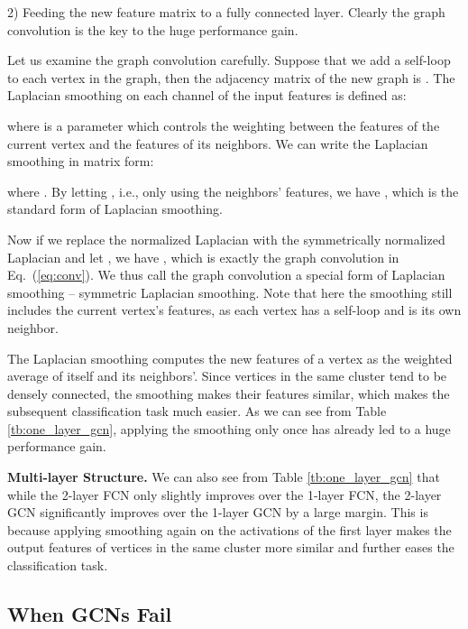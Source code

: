 \documentclass[letterpaper]{article} \usepackage{aaai18}  \usepackage{times}  \usepackage{helvet}  \usepackage{courier}  \usepackage{url}  \usepackage{graphicx}  \usepackage{algorithm}
\begin{document}
2) Feeding the new feature matrix  to a fully connected layer. Clearly the graph convolution is the key to the huge performance gain.

Let us examine the graph convolution carefully. Suppose that we add a self-loop to each vertex in the graph, then the adjacency matrix of the new graph is . The Laplacian smoothing \cite{taubin1995signal} on each channel of the input features is defined as:

where  is a parameter which controls the weighting between the features of the current vertex and the features of its neighbors. We can write the Laplacian smoothing in matrix form:

where . By letting , i.e., only using the neighbors' features, we have , which is the standard form of Laplacian smoothing.

Now if we replace the normalized Laplacian  with the symmetrically normalized Laplacian  and let , we have , which is exactly the graph convolution in Eq.~(\ref{eq:conv}). We thus call the graph convolution a special form of Laplacian smoothing -- symmetric Laplacian smoothing. Note that here the smoothing still includes the current vertex's features, as each vertex has a self-loop and is its own neighbor.







The Laplacian smoothing computes the new features of a vertex as the weighted average of itself and its neighbors'. Since vertices in the same cluster tend to be densely connected, the smoothing makes their features similar, which makes the subsequent classification task much easier. As we can see from Table \ref{tb:one_layer_gcn}, applying the smoothing only once has already led to a huge performance gain.



\textbf{Multi-layer Structure.} We can also see from Table \ref{tb:one_layer_gcn} that while the 2-layer FCN only slightly improves over the 1-layer FCN, the 2-layer GCN significantly improves over the 1-layer GCN by a large margin. This is because applying smoothing again on the activations of the first layer makes the output features of vertices in the same cluster more similar and further eases the classification task.








\subsection{When GCNs Fail}
\end{document}
